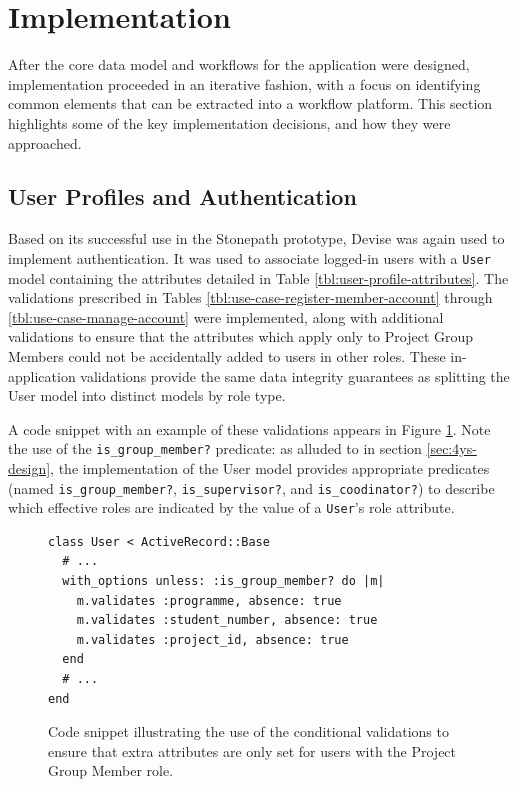 \documentclass[document.tex]{subfiles}
\begin{document}
\section{Implementation}
\label{sec:4ys-implementation}

After the core data model and workflows for the application were designed, implementation proceeded in an iterative fashion, with a focus on identifying common elements that can be extracted into a workflow platform. This section highlights some of the key implementation decisions, and how they were approached.


\subsection{User Profiles and Authentication}
\label{sec:4ys-authentication}

Based on its successful use in the Stonepath prototype, Devise was again used to implement authentication. It was used to associate logged-in users with a \verb!User! model containing the attributes detailed in Table \ref{tbl:user-profile-attributes}. The validations prescribed in Tables \ref{tbl:use-case-register-member-account} through \ref{tbl:use-case-manage-account} were implemented, along with additional validations to ensure that the attributes which apply only to Project Group Members could not be accidentally added to users in other roles. These in-application validations provide the same data integrity guarantees as splitting the User model into distinct models by role type.

A code snippet with an example of these validations appears in Figure \ref{fig:4ys-user-validations}. Note the use of the \verb!is_group_member?! predicate: as alluded to in section \ref{sec:4ys-design}, the implementation of the User model provides appropriate predicates (named \verb!is_group_member?!, \verb!is_supervisor?!, and \verb!is_coodinator?!) to describe which effective roles are indicated by the value of a \verb!User!’s role attribute.

\begin{figure}[!ht]
  \begin{lstlisting}
class User < ActiveRecord::Base
  # ...
  with_options unless: :is_group_member? do |m|
    m.validates :programme, absence: true
    m.validates :student_number, absence: true
    m.validates :project_id, absence: true
  end
  # ...
end
  \end{lstlisting}
  \caption{Code snippet illustrating the use of the conditional validations to ensure that extra attributes are only set for users with the Project Group Member role.}
  \label{fig:4ys-user-validations}
\end{figure}
\end{document}
